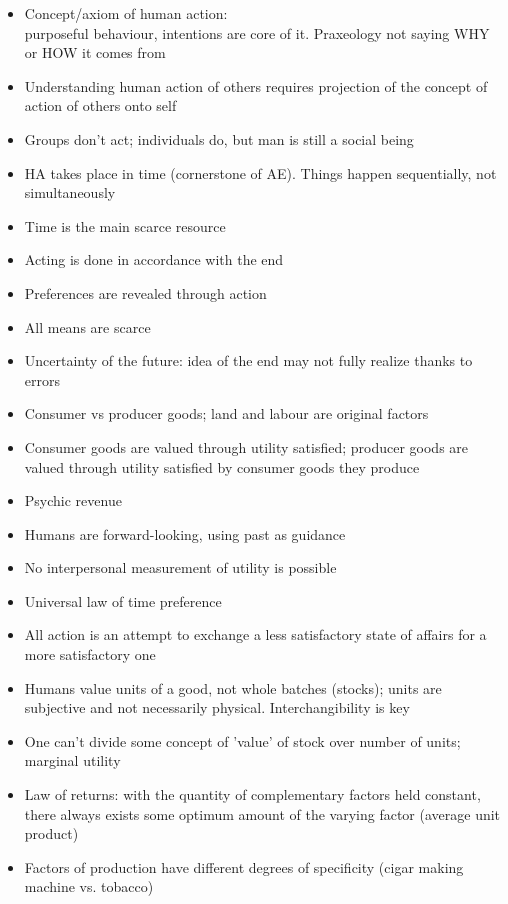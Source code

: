 \documentclass[]{article}
\begin{document}
\begin{itemize}
    \item Concept/axiom of human action: \\ purposeful behaviour, intentions are core of it. Praxeology not saying WHY or HOW it comes from
    \item Understanding human action of others requires projection of the concept of action of others onto self
    \item Groups don't act; individuals do, but man is still a social being
    \item HA takes place in time (cornerstone of AE). Things happen sequentially, not simultaneously
    \item Time is the main scarce resource
    \item Acting is done in accordance with the end
    \item Preferences are revealed through action
    \item All means are scarce
    \item Uncertainty of the future: idea of the end may not fully realize thanks to errors
    \item Consumer vs producer goods; land and labour are original factors
    \item Consumer goods are valued through utility satisfied; producer goods are valued through utility satisfied by consumer goods they produce
    \item Psychic revenue
    \item Humans are forward-looking, using past as guidance
    \item No interpersonal measurement of utility is possible
    \item Universal law of time preference
    \item All action is an attempt to exchange a less satisfactory state of affairs for a more satisfactory one
    \item Humans value units of a good, not whole batches (stocks); units are subjective and not necessarily physical. Interchangibility is key
    \item One can't divide some concept of 'value' of stock over number of units; marginal utility
    \item Law of returns: with the quantity of complementary factors held constant, there always exists some optimum amount of the varying factor (average unit product)
    \item Factors of production have different degrees of specificity (cigar making machine vs. tobacco)

\end{itemize}
\end{document}
